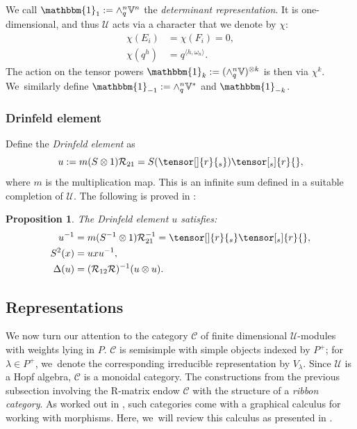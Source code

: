 \documentclass[JEP,XML,SOM,Unicode,published]{cedram}
\newtheorem{prop}[thm]{Proposition}
\theoremstyle{definition}
\newcommand{\UU}{\mathcal{U}}
\begin{document}
We call $\mathbbm{1}_1:=\wedge^n_q\mathbb{V}^n$ the \textit{determinant representation}.
It is one-dimensional, and thus $\UU$ acts via a character that we denote by $\chi$:
\begin{equation}
\begin{aligned}
\chi(E_i)&=\chi(F_i)=0,\\
\chi(q^{h})&=q^{\langle h,\omega_n\rangle}.
\end{aligned}
\label{DetForm}
\end{equation}
The action on the tensor powers $\mathbbm{1}_k:=(\wedge^n_q\mathbb{V})^{\otimes k}$ is then via $\chi^k$. We~similarly define $\mathbbm{1}_{-1}:=\wedge_q^n\mathbb{V}^*$ and $\mathbbm{1}_{-k}$.

\subsubsection{Drinfeld element}
Define the \textit{Drinfeld element} as
\[
u:=m(S\otimes 1)\mathcal{R}_{21}=S(\tensor[]{r}{_s})\tensor[_s]{r}{},
\]
where $m$ is the multiplication map.
This is an infinite sum defined in a suitable completion of $\mathcal{U}$.
The following is proved in \cite{DrinAlmost}:
\begin{prop}
The Drinfeld element $u$ satisfies:
\begin{align}
u^{-1}&=m(S^{-1}\otimes 1)\mathcal{R}_{21}^{-1}=\tensor[]{r}{_s}\tensor[_s]{r}{}\label{DrinInv},\\
S^2(x)&=u xu^{-1}\label{DrinEle},\\
\Delta(u)&= (\mathcal{R}_{12}\mathcal{R})^{-1}(u\otimes u).\label{DrinCo}
\end{align}
\end{prop}

\subsection{Representations}\label{Reps}
We now turn our attention to the category $\mathcal{C}$ of finite dimensional $\mathcal{U}$-modules with weights lying in $P$.
$\mathcal{C}$ is semisimple with simple objects indexed by $P^+$; for $\lambda\in P^+$, we~denote the corresponding irreducible representation by $V_\lambda$.
Since $\mathcal{U}$ is a Hopf algebra, $\mathcal{C}$ is a monoidal category.
The constructions from the previous subsection involving the R-matrix endow $\mathcal{C}$ with the structure of a \textit{ribbon category}.
As worked out in \cite{ReshTurRibbon}, such categories come with a graphical calculus for working with morphisms.
Here, we~will review this calculus as presented in \cite[\S 2.3]{BakKir}.
\end{document}
